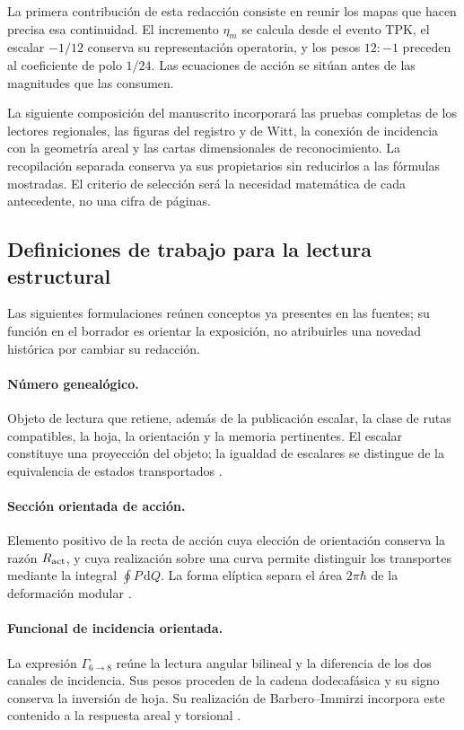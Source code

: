 \documentclass[11pt,a4paper]{article}
\numberwithin{equation}{section}
\theoremstyle{definition}
\newcommand{\dd}{\mathrm d}
\begin{document}
La primera contribución de esta redacción consiste en reunir los
mapas que hacen precisa esa continuidad. El incremento $\eta_m$
se calcula desde el evento TPK, el escalar $-1/12$ conserva su
representación operatoria, y los pesos $12:-1$ preceden al
coeficiente de polo $1/24$. Las ecuaciones de acción se sitúan
antes de las magnitudes que las consumen.

La siguiente composición del manuscrito incorporará las pruebas
completas de los lectores regionales, las figuras del registro
y de Witt, la conexión de incidencia con la geometría areal
y las cartas dimensionales de reconocimiento. La recopilación
separada conserva ya sus propietarios sin reducirlos a las
fórmulas mostradas. El criterio de selección será la necesidad
matemática de cada antecedente, no una cifra de páginas.

\subsection{Definiciones de trabajo para la lectura estructural}
Las siguientes formulaciones reúnen conceptos ya presentes en las fuentes;
su función en el borrador es orientar la exposición, no atribuirles
una novedad histórica por cambiar su redacción.

\paragraph{Número genealógico.}
Objeto de lectura que retiene, además de la publicación escalar, la
clase de rutas compatibles, la hoja, la orientación y la memoria
pertinentes. El escalar constituye una proyección del objeto; la igualdad
de escalares se distingue de la equivalencia de estados transportados
\cite{segmento,registro}.

\paragraph{Sección orientada de acción.}
Elemento positivo de la recta de acción cuya elección de orientación
conserva la razón $R_{\rm act}$, y cuya realización sobre una curva
permite distinguir los transportes mediante la integral $\oint P\,\dd Q$.
La forma elíptica separa el área $2\pi\hbar$ de la deformación modular
\cite{accion,elipse}.

\paragraph{Funcional de incidencia orientada.}
La expresión $\Gamma_{6\to8}$ reúne la lectura angular bilineal y la
diferencia de los dos canales de incidencia. Sus pesos proceden de la
cadena dodecafásica y su signo conserva la inversión de hoja. Su
realización de Barbero--Immirzi incorpora este contenido a la respuesta
areal y torsional \cite{precedencia,holst}.
\end{document}
